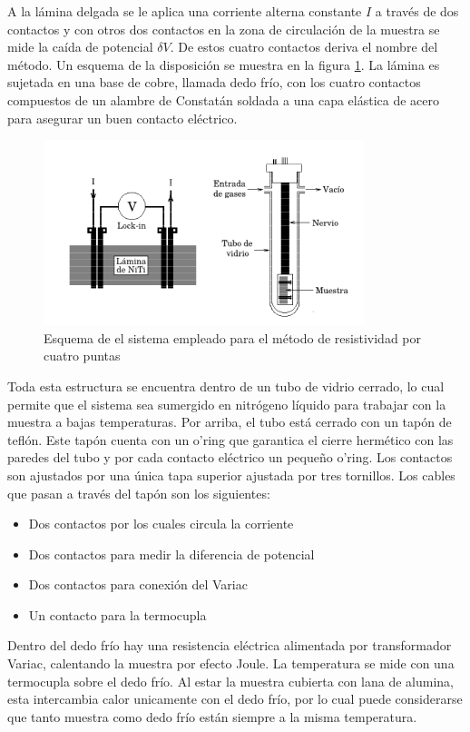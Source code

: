 \documentclass{article}
\theoremstyle{definition}
\theoremstyle{remark}
\begin{document}
A la lámina delgada se le aplica una corriente alterna constante $I$ a través de dos contactos y con otros dos contactos en la zona de circulación de la muestra se mide la caída de potencial $\delta V$. De estos cuatro contactos deriva el nombre del método. Un esquema de la disposición se muestra en la figura \ref{4puntas}. La lámina es sujetada en una base de cobre, llamada dedo frío, con los cuatro contactos compuestos de un alambre de Constatán soldada a una capa elástica de acero para asegurar un buen contacto eléctrico.

 \begin{figure}[H]
 	\centering
	\includegraphics[scale=0.5]{img/r4puntas.png}
 	\caption{Esquema de el sistema empleado para el método de resistividad por  cuatro puntas}
	\label{4puntas}
\end{figure} 

Toda esta estructura se encuentra dentro de un tubo de vidrio cerrado, lo cual permite que el sistema sea sumergido en nitrógeno líquido para trabajar con la muestra a bajas temperaturas. Por arriba, el tubo está cerrado con un tapón de teflón. Este tapón cuenta con un o'ring que garantica el cierre hermético con las paredes del tubo y por cada contacto eléctrico un pequeño o'ring. Los contactos son ajustados por una única tapa superior ajustada por tres tornillos. Los cables que pasan a través del tapón son los siguientes:
\begin{itemize}
\item Dos contactos por los cuales circula la corriente 
\item Dos contactos para medir la diferencia de potencial
\item Dos contactos para conexión del Variac
\item Un contacto para la termocupla
\end{itemize}


Dentro del dedo frío hay una resistencia eléctrica alimentada por transformador Variac, calentando la muestra por efecto Joule. La temperatura se mide con una termocupla sobre el dedo frío. Al estar la muestra cubierta con lana de alumina, esta intercambia calor unicamente con el dedo frío, por lo cual puede considerarse que tanto muestra como dedo frío están siempre a la misma temperatura.
\end{document}
